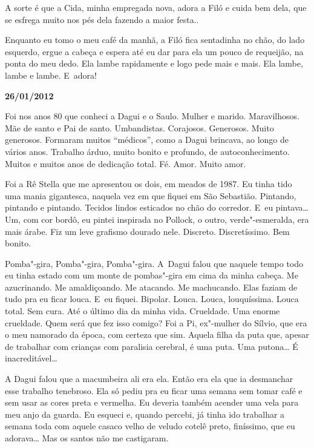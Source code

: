 A sorte é que a Cida, minha empregada nova, adora a Filó e cuida bem
dela, que se esfrega muito nos pés dela fazendo a maior festa..

Enquanto eu tomo o meu café da manhã, a Filó fica sentadinha no chão, do
lado esquerdo, ergue a cabeça e espera até eu dar para ela um pouco de
requeijão, na ponta do meu dedo. Ela lambe rapidamente e logo pede mais
e mais. Ela lambe, lambe e lambe. E~adora!

\begin{center}\asterisc{}\end{center}

\begin{flushright}\textbf{26/01/2012}\end{flushright}


Foi nos anos 80 que conheci a Dagui e o Saulo. Mulher e marido.
Maravilhosos. Mãe de santo e Pai de santo. Umbandistas. Corajosos.
Generosos. Muito generosos. Formaram muitos ``médicos'', como a Dagui
brincava, ao longo de vários anos. Trabalho árduo, muito bonito e
profundo, de autoconhecimento. Muitos e muitos anos de dedicação total.
Fé. Amor. Muito amor.

Foi a Rê Stella que me apresentou os dois, em meados de 1987. Eu tinha
tido uma mania gigantesca, naquela vez em que fiquei em São Sebastião.
Pintando, pintando e pintando. Tecidos lindos esticados no chão do
corredor. E~eu pintava… Um, com cor bordô, eu pintei inspirada no
Pollock, o outro, verde"-esmeralda, era mais árabe. Fiz um leve grafismo
dourado nele. Discreto. Discretíssimo. Bem bonito.

Pomba"-gira, Pomba"-gira, Pomba"-gira. A~Dagui falou que naquele tempo todo
eu tinha estado com um monte de pombas"-gira em cima da minha cabeça. Me
azucrinando. Me amaldiçoando. Me atacando. Me machucando. Elas faziam de
tudo pra eu ficar louca. E~eu fiquei. Bipolar. Louca. Louca,
louquíssima. Louca total. Sem cura. Até o último dia da minha vida.
Crueldade. Uma enorme crueldade. Quem será que fez isso comigo? Foi a
Pi, ex"-mulher do Sílvio, que era o meu namorado da época, com certeza
que sim. Aquela filha da puta que, apesar de trabalhar com crianças com
paralisia cerebral, é uma puta. Uma putona… É
inacreditável…

A Dagui falou que a macumbeira ali era ela. Então era ela que ia
desmanchar esse trabalho tenebroso. Ela só pediu pra eu ficar uma semana
sem tomar café e sem usar as cores preta e vermelha. Eu deveria também
acender uma vela para meu anjo da guarda. Eu esqueci e, quando percebi,
já tinha ido trabalhar a semana toda com aquele casaco velho de veludo
cotelê preto, finíssimo, que eu adorava… Mas os santos não me
castigaram.

